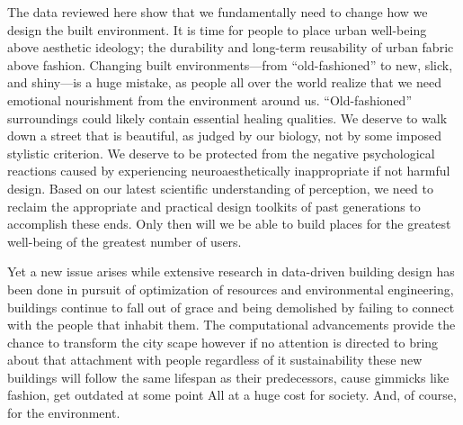 The data reviewed here show that we fundamentally need to change how we design
the built environment.
It is time for people to place urban well-being above aesthetic ideology; the durability and long-term reusability of urban fabric above fashion. Changing
built environments—from “old-fashioned” to new, slick, and shiny—is a huge mistake, as people all over the world realize that we need emotional nourishment from the environment around us.
“Old-fashioned” surroundings could likely contain essential healing qualities.
We deserve to walk down a street that is beautiful, as judged by our biology, not by
some imposed stylistic criterion.
We deserve to be protected from the negative psychological reactions caused by experiencing neuroaesthetically inappropriate if not harmful design.
Based on our latest scientific understanding of perception, we need to reclaim
the appropriate and practical design toolkits of past generations to accomplish these ends.
Only then will we be able to build places for the greatest well-being of the greatest number of users.


Yet a new issue arises while extensive research in data-driven building design has been done in pursuit of optimization of resources and environmental engineering, buildings continue to fall out of grace and being demolished by failing to connect with the people that inhabit them.
The computational advancements provide the chance to transform the city scape however if no attention is directed to bring about that attachment with people regardless of it sustainability these new buildings will follow the same lifespan as their predecessors, cause gimmicks like fashion, get outdated at some point All at a huge cost for society. And, of course, for the environment. \cite{Brielmann2022}
